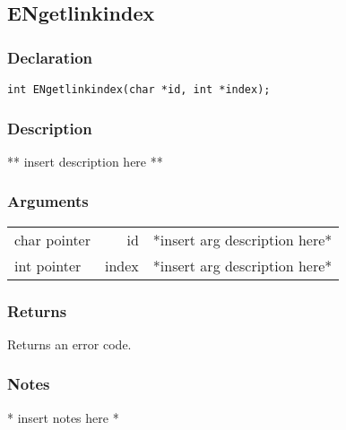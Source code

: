\subsection{ENgetlinkindex}
\subsubsection{Declaration}
\begin{lstlisting}
int ENgetlinkindex(char *id, int *index);
\end{lstlisting}
\subsubsection{Description}
** insert description here **
\subsubsection{Arguments}
\begin{tabular}{l r p{11cm} }
char pointer&id&*insert arg description here* \\[6pt]
int pointer&index&*insert arg description here* \\[6pt]
\end{tabular}
\subsubsection{Returns}
Returns an error code.
\subsubsection{Notes}
* insert notes here *